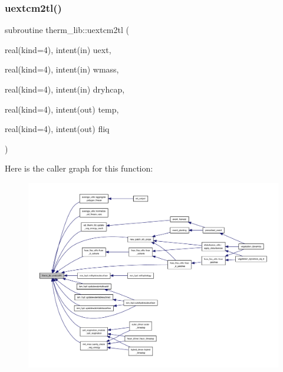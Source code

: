 \mbox{\label{namespacetherm__lib_ac588ab0dc1c0c52c4c41b847be134ee9}} 
\subsubsection{\texorpdfstring{uextcm2tl()}{uextcm2tl()}}
{\footnotesize\ttfamily subroutine therm\+\_\+lib\+::uextcm2tl (\begin{DoxyParamCaption}\item[{real(kind=4), intent(in)}]{uext,  }\item[{real(kind=4), intent(in)}]{wmass,  }\item[{real(kind=4), intent(in)}]{dryhcap,  }\item[{real(kind=4), intent(out)}]{temp,  }\item[{real(kind=4), intent(out)}]{fliq }\end{DoxyParamCaption})}

Here is the caller graph for this function\+:
\nopagebreak
\begin{figure}[H]
\begin{center}
\leavevmode
\includegraphics[width=350pt]{namespacetherm__lib_ac588ab0dc1c0c52c4c41b847be134ee9_icgraph}
\end{center}
\end{figure}
\mbox{\label{namespacetherm__lib_a6ded17767672913967afa919fef33015}} 
